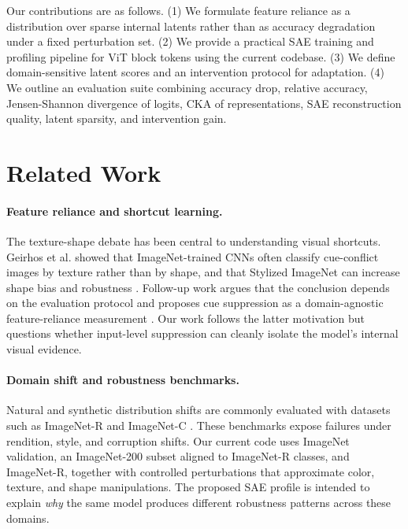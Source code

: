 \documentclass{article}
\begin{document}
Our contributions are as follows. (1) We formulate feature reliance as a distribution over sparse internal latents rather than as accuracy degradation under a fixed perturbation set. (2) We provide a practical SAE training and profiling pipeline for ViT block tokens using the current codebase. (3) We define domain-sensitive latent scores and an intervention protocol for adaptation. (4) We outline an evaluation suite combining accuracy drop, relative accuracy, Jensen-Shannon divergence of logits, CKA of representations, SAE reconstruction quality, latent sparsity, and intervention gain.

\section{Related Work}

\paragraph{Feature reliance and shortcut learning.}
The texture-shape debate has been central to understanding visual shortcuts. Geirhos et al. showed that ImageNet-trained CNNs often classify cue-conflict images by texture rather than by shape, and that Stylized ImageNet can increase shape bias and robustness \cite{geirhos2019imagenet}. Follow-up work argues that the conclusion depends on the evaluation protocol and proposes cue suppression as a domain-agnostic feature-reliance measurement \cite{imagenetnottexture2025}. Our work follows the latter motivation but questions whether input-level suppression can cleanly isolate the model's internal visual evidence.

\paragraph{Domain shift and robustness benchmarks.}
Natural and synthetic distribution shifts are commonly evaluated with datasets such as ImageNet-R \cite{kim2021imagenetr} and ImageNet-C \cite{hendrycks2019imagenetc}. These benchmarks expose failures under rendition, style, and corruption shifts. Our current code uses ImageNet validation, an ImageNet-200 subset aligned to ImageNet-R classes, and ImageNet-R, together with controlled perturbations that approximate color, texture, and shape manipulations. The proposed SAE profile is intended to explain \emph{why} the same model produces different robustness patterns across these domains.
\end{document}
